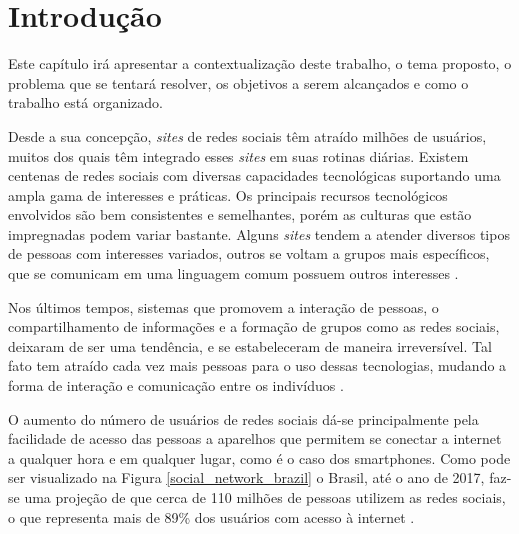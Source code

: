 \chapter[Introdução]{Introdução}

Este capítulo irá apresentar a contextualização deste trabalho, o tema proposto, o problema que se tentará resolver, os objetivos a serem alcançados e como o trabalho está organizado.

Desde a sua concepção, \textit{sites} de redes sociais têm atraído milhões de usuários, muitos dos quais têm integrado esses \textit{sites} em suas rotinas diárias. Existem centenas de redes sociais com diversas capacidades tecnológicas suportando uma ampla gama de interesses e práticas. Os principais recursos tecnológicos envolvidos são bem consistentes e semelhantes, porém as culturas que estão impregnadas podem variar bastante. Alguns \textit{sites} tendem a atender diversos tipos de pessoas com interesses variados, outros se voltam a grupos mais específicos, que se comunicam em uma linguagem comum possuem outros interesses \cite{Boyd:Ellison:2007}.

Nos últimos tempos, sistemas que promovem a interação de pessoas, o compartilhamento de informações e a formação de grupos como as redes sociais, deixaram de ser uma tendência, e se estabeleceram de maneira irreversível. Tal fato tem atraído cada vez mais pessoas para o uso dessas tecnologias, mudando a forma de interação e comunicação entre os indivíduos \cite{Santana:Melo-Solarte:Neris:Miranda:Baranauskas:2009}.

O aumento do número de usuários de redes sociais dá-se principalmente pela facilidade de acesso das pessoas a aparelhos que permitem se conectar a internet a qualquer hora e em qualquer lugar, como é o caso dos smartphones. Como pode ser visualizado na Figura \ref{social_network_brazil} o Brasil, até o ano de 2017, faz-se uma projeção de que cerca de 110 milhões de pessoas utilizem as redes sociais, o que representa mais de 89\% dos usuários com acesso à internet \cite{eMarketer:2013}.

\newpage

